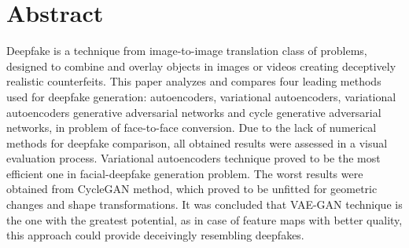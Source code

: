 \chapter{Abstract}
Deepfake is a technique from image-to-image translation class of problems, designed to combine and overlay objects in images or videos creating deceptively realistic counterfeits. This paper analyzes and compares four leading methods used for deepfake generation: autoencoders, variational autoencoders,  variational autoencoders generative adversarial networks and cycle generative adversarial networks, in problem of face-to-face conversion. Due to the lack of numerical methods for deepfake comparison, all obtained results were assessed in a visual evaluation process. Variational autoencoders technique proved to be the most efficient one in facial-deepfake generation problem. The worst results were obtained from CycleGAN method, which proved to be unfitted for geometric changes and shape transformations. It was concluded that VAE-GAN technique is the one with the greatest potential, as in case of feature maps with better quality, this approach could provide deceivingly resembling deepfakes.